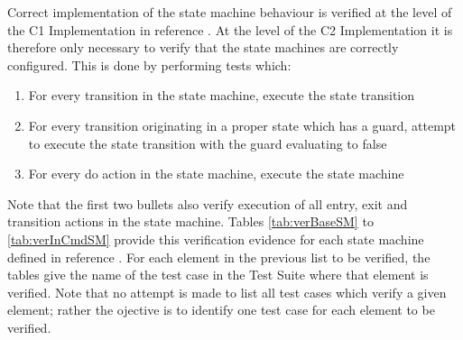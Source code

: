 \documentclass{pnp_article}
\begin{document}
Correct implementation of the state machine behaviour is verified at the level of the C1 Implementation in reference \cite{ref:C1UserReq}. At the level of the C2 Implementation it is therefore only necessary to verify that the state machines are correctly configured. This is done by performing tests which:

\begin{enumerate}
\item For every transition in the state machine, execute the state transition 
\item For every transition originating in a proper state which has a guard, attempt to execute the state transition with the guard evaluating to false
\item For every do action in the state machine, execute the state machine
\end{enumerate}

Note that the first two bullets also verify execution of all entry, exit and transition actions in the state machine. Tables \ref{tab:verBaseSM} to \ref{tab:verInCmdSM} provide this verification evidence for each state machine defined in reference \cite{ref:cordetfw}. For each element in the previous list to be verified, the tables give the name of the test case in the Test Suite where that element is verified. Note that no attempt is made to list all test cases which verify a given element; rather the ojective is to identify one test case for each element to be verified. 
\end{document}
